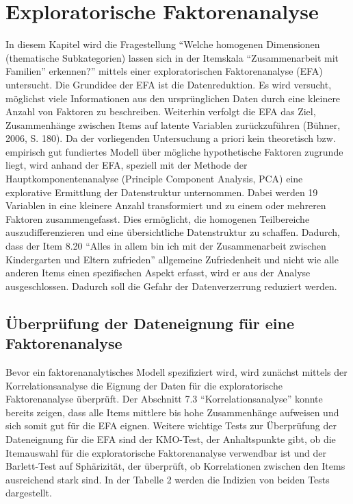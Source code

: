 \documentclass[12pt,a4paper]{article}
\begin{document}
\section{Exploratorische Faktorenanalyse} 
In diesem Kapitel wird die Fragestellung "`Welche homogenen Dimensionen  (thematische Subkategorien) lassen sich in der Itemskala "`Zusammenarbeit mit Familien"' erkennen?"' mittels einer exploratorischen Faktorenanalyse (EFA) untersucht. 
	Die Grundidee der EFA ist die Datenreduktion. Es wird versucht, möglichst viele Informationen aus den ursprünglichen Daten durch eine kleinere Anzahl von Faktoren zu beschreiben. Weiterhin verfolgt die EFA das Ziel, Zusammenhänge zwischen Items auf latente Variablen zurückzuführen (Bühner, 2006, S. 180).
	Da der vorliegenden Untersuchung a priori kein theoretisch bzw. empirisch gut fundiertes Modell über mögliche hypothetische Faktoren zugrunde liegt, wird anhand der EFA, speziell mit der Methode der Hauptkomponentenanalyse (Principle Component Analysis, PCA) eine explorative Ermittlung der Datenstruktur unternommen. Dabei werden 19 Variablen in eine kleinere Anzahl transformiert und zu einem oder mehreren Faktoren zusammengefasst. Dies ermöglicht, die homogenen Teilbereiche auszudifferenzieren und eine übersichtliche Datenstruktur zu schaffen. Dadurch, dass der Item 8.20 "`Alles in allem bin ich mit der Zusammenarbeit zwischen Kindergarten und Eltern zufrieden"' allgemeine Zufriedenheit und nicht wie alle anderen Items einen spezifischen Aspekt erfasst, wird er aus der Analyse ausgeschlossen. Dadurch soll die Gefahr der Datenverzerrung reduziert werden.

\subsection{Überprüfung der Dateneignung für eine Faktorenanalyse} 
Bevor ein faktorenanalytisches Modell spezifiziert wird, wird zunächst mittels der Korrelationsanalyse die Eignung der Daten für die exploratorische Faktorenanalyse überprüft. Der Abschnitt 7.3 "`Korrelationsanalyse"' konnte bereits zeigen, dass alle Items mittlere bis hohe Zusammenhänge aufweisen und sich somit gut für die EFA eignen. Weitere wichtige Tests zur Überprüfung der Dateneignung für die EFA sind der KMO-Test, der Anhaltspunkte gibt, ob die Itemauswahl für die exploratorische Faktorenanalyse verwendbar ist und der Barlett-Test auf Sphärizität, der überprüft, ob Korrelationen zwischen den Items ausreichend stark sind. In der Tabelle 2 werden die Indizien von beiden Tests dargestellt.
\end{document}
